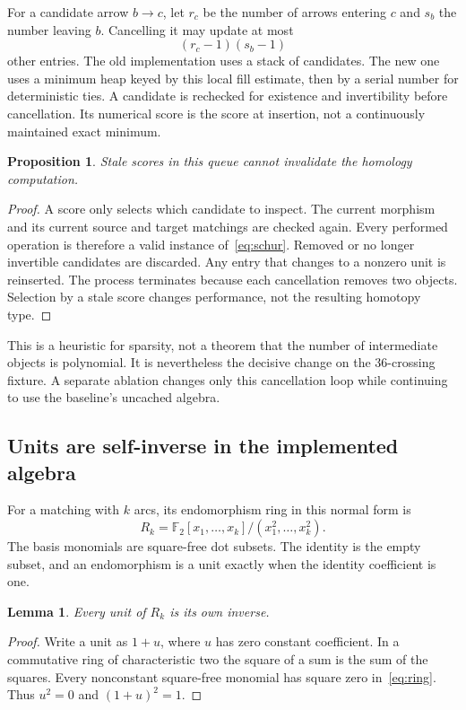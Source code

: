 \documentclass[11pt]{article}
\newtheorem{proposition}[theorem]{Proposition}
\newtheorem{lemma}[theorem]{Lemma}
\theoremstyle{definition}\newtheorem{definition}[theorem]{Definition}
\theoremstyle{remark}\newtheorem{remark}[theorem]{Remark}
\newcommand{\F}{\mathbb F_2}
\begin{document}
For a candidate arrow $b\to c$, let $r_c$ be the number of arrows entering $c$
and $s_b$ the number leaving $b$. Cancelling it may update at most
\begin{equation}\label{eq:score}
  (r_c-1)(s_b-1)
\end{equation}
other entries. The old implementation uses a stack of candidates. The new
one uses a minimum heap keyed by this local fill estimate, then by a serial
number for deterministic ties. A candidate is rechecked for existence and
invertibility before cancellation. Its numerical score is the score at
insertion, not a continuously maintained exact minimum.

\begin{proposition}
Stale scores in this queue cannot invalidate the homology computation.
\end{proposition}
\begin{proof}
A score only selects which candidate to inspect. The current morphism and its
current source and target matchings are checked again. Every performed
operation is therefore a valid instance of~\eqref{eq:schur}. Removed or no
longer invertible candidates are discarded. Any entry that changes to a
nonzero unit is reinserted. The process terminates because each cancellation
removes two objects. Selection by a stale score changes performance, not the
resulting homotopy type.
\end{proof}

This is a heuristic for sparsity, not a theorem that the number of intermediate
objects is polynomial. It is nevertheless the decisive change on the
36-crossing fixture. A separate ablation changes only this cancellation loop
while continuing to use the baseline's uncached algebra.

\subsection{Units are self-inverse in the implemented algebra}

For a matching with $k$ arcs, its endomorphism ring in this normal form is
\begin{equation}\label{eq:ring}
 R_k=\F[x_1,\ldots,x_k]/(x_1^2,\ldots,x_k^2).
\end{equation}
The basis monomials are square-free dot subsets. The identity is the empty
subset, and an endomorphism is a unit exactly when the identity coefficient
is one.

\begin{lemma}\label{lem:inverse}
Every unit of $R_k$ is its own inverse.
\end{lemma}
\begin{proof}
Write a unit as $1+u$, where $u$ has zero constant coefficient. In a commutative
ring of characteristic two the square of a sum is the sum of the squares.
Every nonconstant square-free monomial has square zero in~\eqref{eq:ring}.
Thus $u^2=0$ and $(1+u)^2=1$.
\end{proof}
\end{document}
